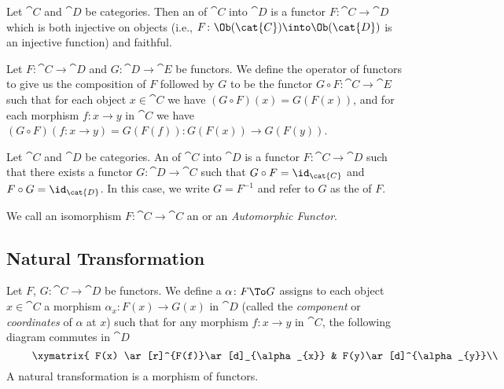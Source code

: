 \begin{definition}
Let $\cat{C}$ and $\cat{D}$ be categories.
Then an  of $\cat{C}$ into $\cat{D}$ is a functor
$F\colon\cat{C}\to\cat{D}$ which is both injective on objects (i.e.,
$F\colon\Ob(\cat{C})\into\Ob(\cat{D})$ is an injective function) and faithful.
\end{definition}

\begin{definition}
Let $F\colon\cat{C}\to\cat{D}$ and $G\colon\cat{D}\to\cat{E}$ be functors.
We define the  operator of functors to give us the
composition of $F$ followed by $G$ to be the functor $G\circ F\colon\cat{C}\to\cat{E}$
such that for each object $x\in\cat{C}$ we have $(G\circ F)(x)=G(F(x))$,
and for each morphism $f\colon x\to y$ in $\cat{C}$ we have
$(G\circ F)(f\colon x\to y)=G(F(f))\colon G(F(x))\to G(F(y))$.
\end{definition}

\begin{definition}
Let $\cat{C}$ and $\cat{D}$ be categories.
An  of $\cat{C}$ into $\cat{D}$ is a functor
$F\colon\cat{C}\to\cat{D}$ such that there exists a functor
$G\colon\cat{D}\to\cat{C}$ such that $G\circ F=\id_{\cat{C}}$ and
$F\circ G=\id_{\cat{D}}$. In this case, we write $G=F^{-1}$ and refer
to $G$ as the  of $F$.

We call an isomorphism $F\colon\cat{C}\to\cat{C}$ an
 or an \emph{Automorphic Functor}.
\end{definition}

\subsection{Natural Transformation}

\begin{definition}
Let $F$, $G\colon\cat{C}\to\cat{D}$ be functors.
We define a  $\alpha\colon F\To G$
assigns to each object $x\in\cat{C}$ a morphism $\alpha_{x}\colon F(x)\to G(x)$
in $\cat{D}$ (called the \emph{component} or \emph{coordinates} of $\alpha$ at $x$) such
that for any morphism $f\colon x\to y$ in $\cat{C}$, the following
diagram commutes in $\cat{D}$
\begin{equation}
\vcenter{\xymatrix{
F(x) \ar[r]^{F(f)}\ar[d]_{\alpha_{x}} & F(y)\ar[d]^{\alpha_{y}}\\ 
G(x) \ar[r]_{G(f)} & G(y)
}}
\end{equation}
A natural transformation is a morphism of functors.
\end{definition}

